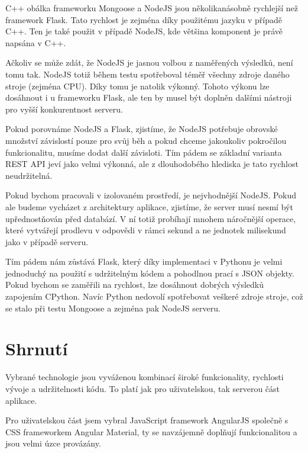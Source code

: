 C++ obálka frameworku Mongoose a NodeJS jsou několikanásobně rychlejší než framework Flask. Tato rychlost je zejména díky použitému jazyku v případě C++. Ten je také použit v případě NodeJS, kde většina komponent je právě napsána v C++. 

Ačkoliv se může zdát, že NodeJS je jasnou volbou z naměřených výsledků, není tomu tak. NodeJS totiž během testu spotřeboval téměř všechny zdroje daného stroje (zejména CPU). Díky tomu je natolik výkonný. Tohoto výkonu lze dosáhnout i u frameworku Flask, ale ten by musel být doplněn dalšími nástroji pro vyšší konkurentnost serveru.

Pokud porovnáme NodeJS a Flask, zjistíme, že NodeJS potřebuje obrovské množství závislostí pouze pro svůj běh a pokud chceme jakoukoliv pokročilou funkcionalitu, musíme dodat další závisloti. Tím pádem se základní varianta REST API jeví jako velmi výkonná, ale z dlouhodobého hlediska je tato rychlost neudržitelná.

Pokud bychom pracovali v izolovaném prostředí, je nejvhodnější NodeJS. Pokud ale budeme vycházet z architektury aplikace, zjistíme, že server musí nesmí být upřednostňován před databází. V ní totiž probíhají mnohem náročnější operace, které vytvářejí prodlevu v odpovědi v rámci sekund a ne jednotek milisekund jako v případě serveru. 

Tím pádem nám zůstává Flask, který díky implementaci v Pythonu je velmi jednoduchý na použití s udržitelným kódem a pohodlnou prací s JSON objekty. Pokud bychom se zaměřili na rychlost, lze dosáhnout dobrých výsledků zapojením CPython. Navíc Python nedovolí spotřebovat veškeré zdroje stroje, což se stalo při testu Mongoose a zejména pak NodeJS serveru.


\section{Shrnutí}

Vybrané technologie jsou vyváženou kombinací široké funkcionality, rychlosti vývoje a udržitelnosti kódu. To platí jak pro uživatelskou, tak serverou část aplikace.

Pro uživatelskou část jsem vybral JavaScript framework AngularJS společně s CSS frameworkem Angular Material, ty se navzájemně doplňují funkcionalitou a jsou velmi úzce provázány.

